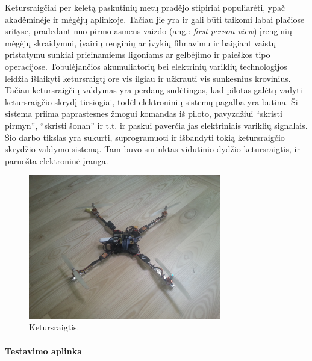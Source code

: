 \documentclass[12pt, a4paper, lithuanian, final]{article}
\begin{document}
\newpage
\tableofcontents



Ketursraigčiai per keletą paskutinių metų pradėjo stipiriai populiarėti, ypač akadėminėje ir mėgėjų aplinkoje.
Tačiau jie yra ir gali būti taikomi labai plačiose srityse, pradedant nuo pirmo-asmens vaizdo (ang.: \textit{first-person-view}) įrenginių mėgėjų skraidymui, įvairių renginių ar įvykių filmavimu ir baigiant vaistų pristatymu sunkiai prieinamiems ligoniams ar
gelbėjimo ir paieškos tipo operacijose.
Tobulėjančios akumuliatorių bei elektrinių variklių technologijos leidžia išlaikyti ketursraigtį ore vis ilgiau ir užkrauti vis sunkesnius krovinius.
Tačiau ketursraigčių valdymas yra perdaug sudėtingas, kad pilotas galėtų vadyti ketursraigčio skrydį tiesiogiai, todėl elektroninių sistemų pagalba yra būtina.
Ši sistema priima paprastesnes žmogui komandas iš piloto, pavyzdžiui "`skristi pirmyn"', "`skristi šonan"' ir t.t. ir paskui paverčia jas elektriniais variklių signalais.
Šio darbo tikslas yra sukurti, suprogramuoti ir išbandyti tokią ketursraigčio skrydžio valdymo sistemą.
Tam buvo surinktas vidutinio dydžio ketursraigtis, ir paruošta elektroninė įranga.

\begin{figure}[H]
\begin{center}
\includegraphics[width=0.75\textwidth]{img/quad.jpg}
\caption{Ketursraigtis.}
\end{center}
\end{figure}


\paragraph{Testavimo aplinka}
\end{document}
